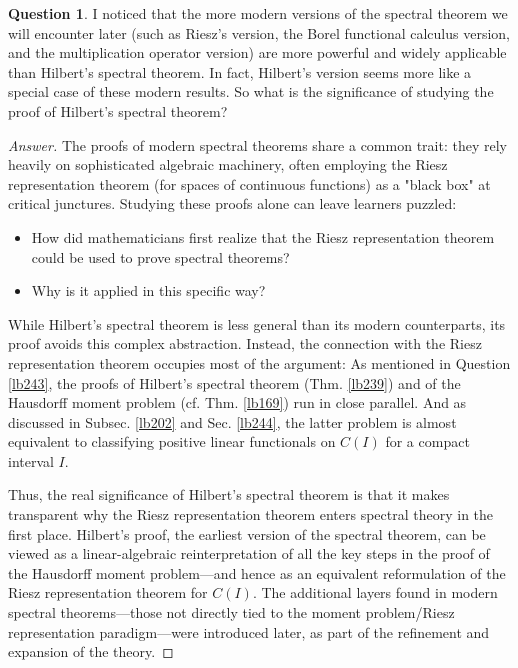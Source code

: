 \documentclass[12pt,b5paper,notitlepage]{article}
\theoremstyle{definition}
\newtheorem{question}[df]{Question}
\theoremstyle{plain}
\numberwithin{equation}{section}
\begin{document}
\begin{question}
I noticed that the more modern versions of the spectral theorem we will encounter later (such as Riesz's version, the Borel functional calculus version, and the multiplication operator version) are more powerful and widely applicable than Hilbert's spectral theorem. In fact, Hilbert's version seems more like a special case of these modern results. So what is the significance of studying the proof of Hilbert's spectral theorem?
\end{question}


\begin{proof}[Answer]
The proofs of modern spectral theorems share a common trait: they rely heavily on sophisticated algebraic machinery, often employing the Riesz representation theorem (for spaces of continuous functions) as a "black box" at critical junctures. Studying these proofs alone can leave learners puzzled:
\begin{itemize}
\item How did mathematicians first realize that the Riesz representation theorem could be used to prove spectral theorems?
\item Why is it applied in this specific way?
\end{itemize}


While Hilbert's spectral theorem is less general than its modern counterparts, its proof avoids this complex abstraction. Instead, the connection with the Riesz representation theorem occupies most of the argument: As mentioned in Question \ref{lb243}, the proofs of Hilbert's spectral theorem (Thm. \ref{lb239}) and of the Hausdorff moment problem (cf. Thm. \ref{lb169}) run in close parallel. And as discussed in Subsec. \ref{lb202} and Sec. \ref{lb244}, the latter problem is almost equivalent to classifying positive linear functionals on $C(I)$ for a compact interval $I$.




Thus, the real significance of Hilbert's spectral theorem is that it makes transparent why the Riesz representation theorem enters spectral theory in the first place. Hilbert's proof, the earliest version of the spectral theorem, can be viewed as a linear-algebraic reinterpretation of all the key steps in the proof of the Hausdorff moment problem---and hence as an equivalent reformulation of the Riesz representation theorem for $C(I)$. The additional layers found in modern spectral theorems---those not directly tied to the moment problem/Riesz representation paradigm---were introduced later, as part of the refinement and expansion of the theory.
\end{proof}
\end{document}
